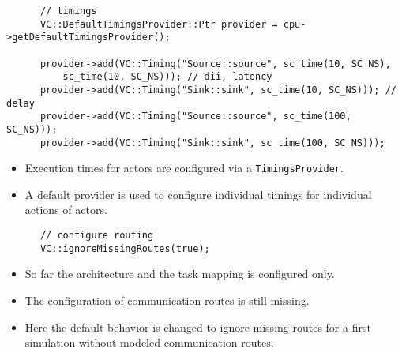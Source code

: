 \begin{frame}[fragile=singleslide]
\begin{lstlisting}
      // timings
      VC::DefaultTimingsProvider::Ptr provider = cpu->getDefaultTimingsProvider();

      provider->add(VC::Timing("Source::source", sc_time(10, SC_NS),
          sc_time(10, SC_NS))); // dii, latency
      provider->add(VC::Timing("Sink::sink", sc_time(10, SC_NS))); // delay
      provider->add(VC::Timing("Source::source", sc_time(100, SC_NS)));
      provider->add(VC::Timing("Sink::sink", sc_time(100, SC_NS)));
\end{lstlisting}
\begin{itemize}
\item Execution times for actors are configured via a \lstinline!TimingsProvider!.
\item A default provider is used to configure individual timings for individual actions of actors.
\end{itemize}
\end{frame}


\begin{frame}[fragile=singleslide]
\begin{lstlisting}
      // configure routing
      VC::ignoreMissingRoutes(true);
\end{lstlisting}
\begin{itemize}
\item So far the architecture and the task mapping is configured only.
\item The configuration of communication routes is still missing.
\item Here the default behavior is changed to ignore missing routes for a first simulation without modeled communication routes.
\end{itemize}
\end{frame}


